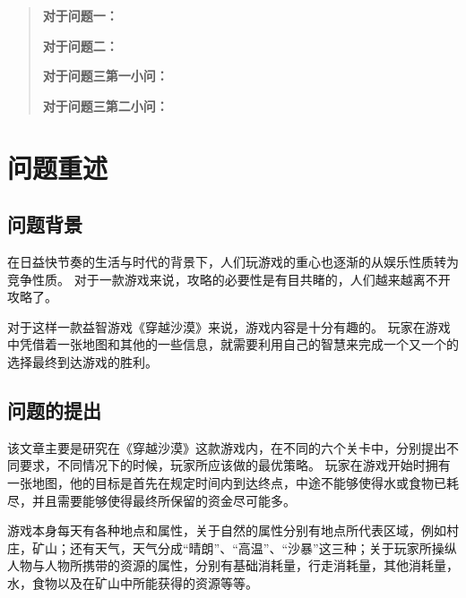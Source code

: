 \documentclass{cumcmthesis}
\title{}
\begin{document}
\maketitle

\begin{abstract}
	\par
	\textbf{对于问题一：}

	\par
	\textbf{对于问题二：}

	\par
	\textbf{对于问题三第一小问：}

	\par
	\textbf{对于问题三第二小问：}

	\par
\end{abstract}



\section{问题重述}
\subsection{问题背景}

在日益快节奏的生活与时代的背景下，人们玩游戏的重心也逐渐的从娱乐性质转为竞争性质。
对于一款游戏来说，攻略的必要性是有目共睹的，人们越来越离不开攻略了。\par

对于这样一款益智游戏《穿越沙漠》来说，游戏内容是十分有趣的。
玩家在游戏中凭借着一张地图和其他的一些信息，就需要利用自己的智慧来完成一个又一个的选择最终到达游戏的胜利。

\subsection{问题的提出}
该文章主要是研究在《穿越沙漠》这款游戏内，在不同的六个关卡中，分别提出不同要求，不同情况下的时候，玩家所应该做的最优策略。
玩家在游戏开始时拥有一张地图，他的目标是首先在规定时间内到达终点，中途不能够使得水或食物已耗尽，并且需要能够使得最终所保留的资金尽可能多。\par

游戏本身每天有各种地点和属性，关于自然的属性分别有地点所代表区域，例如村庄，矿山；还有天气，天气分成“晴朗”、“高温”、“沙暴”这三种；关于玩家所操纵人物与人物所携带的资源的属性，分别有基础消耗量，行走消耗量，其他消耗量，水，食物以及在矿山中所能获得的资源等等。
\end{document}

